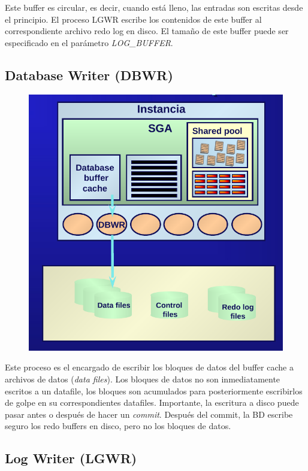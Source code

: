 Este buffer es circular, es decir, cuando está lleno, las entradas son escritas desde el principio. El proceso LGWR escribe los contenidos de este buffer al correspondiente archivo redo log en disco. El tamaño de este buffer puede ser especificado en el parámetro \textit{LOG\_BUFFER}.


\subsection{Database Writer (DBWR)}

\begin{figure}[H]
  \center
  \includegraphics[scale=0.2]{img/p7.png}
\end{figure}

Este proceso es el encargado de escribir los bloques de datos del buffer cache a archivos de datos (\textit{data files}). Los bloques de datos no son inmediatamente escritos a un datafile, los bloques son acumulados para posteriormente escribirlos de golpe en su correspondientes datafiles. Importante, la escritura a disco puede pasar antes o después de hacer un \textit{commit}. Después del commit, la BD escribe seguro los redo buffers en disco, pero no los bloques de datos.

\subsection{Log Writer (LGWR)}

